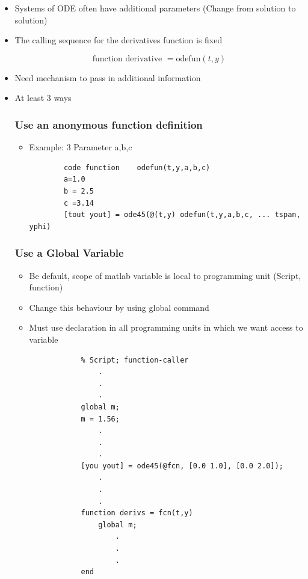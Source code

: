 \begin{itemize}
    \item Systems of ODE often have additional parameters (Change from solution to solution)
    \item The calling sequence for the derivatives function is fixed

    \[ \text{function derivative } = \text{odefun}(t,y)\]

    \item Need mechanism to pass in additional information
    \item At least 3 ways

    \subsubsection{Use an anonymous function definition}

    \begin{itemize}
        \item Example: 3 Parameter a,b,c
        \begin{verbatim}
        code function    odefun(t,y,a,b,c)
        a=1.0
        b = 2.5
        c =3.14
        [tout yout] = ode45(@(t,y) odefun(t,y,a,b,c, ... tspan, yphi)
        \end{verbatim}
    \end{itemize}

    \subsubsection{Use a Global Variable}
    \begin{itemize}
        \item Be default, scope of matlab variable is local to programming unit (Script, function)
        \item Change this behaviour by using global command
        \item Must use declaration in all programming units in which we want access to variable

        \begin{verbatim}
            % Script; function-caller
                .
                .
                .
            global m;
            m = 1.56;
                .   
                .
                .
            [you yout] = ode45(@fcn, [0.0 1.0], [0.0 2.0]);
                .
                .
                .
            function derivs = fcn(t,y)
                global m;
                    .
                    .
                    .
            end
        \end{verbatim}


\end{itemize}
\end{itemize}
